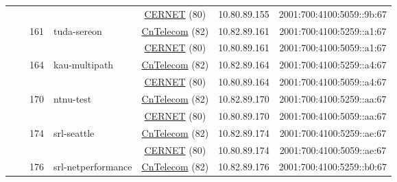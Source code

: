 \begin{small}
\begin{center}
\begin{longtable}{|c|c|c|c|c|c|c|c|}
  &  &  &  & \multicolumn{2}{|c|}{\tiny{\href{http://www.cernet.edu.cn}{CERNET} (80)}} & \tiny{10.80.89.155} & \tiny{2001:700:4100:5059::9b:67} \\* \cline{3-3}\cline{4-4}\cline{5-5}\cline{6-6}\cline{7-7}\cline{8-8}
  &  & \multirow{2}{*}{\tiny{161}} & \multicolumn{1}{|l|}{\multirow{2}{*}{\tiny{tuda-sereon}}} & \multicolumn{2}{|c|}{\tiny{\href{http://www.chinatelecom.com.cn}{CnTelecom} (82)}} & \tiny{10.82.89.161} & \tiny{2001:700:4100:5259::a1:67} \\* \cline{5-5}\cline{6-6}\cline{7-7}\cline{8-8}
  &  &  &  & \multicolumn{2}{|c|}{\tiny{\href{http://www.cernet.edu.cn}{CERNET} (80)}} & \tiny{10.80.89.161} & \tiny{2001:700:4100:5059::a1:67} \\* \cline{3-3}\cline{4-4}\cline{5-5}\cline{6-6}\cline{7-7}\cline{8-8}
  &  & \multirow{2}{*}{\tiny{164}} & \multicolumn{1}{|l|}{\multirow{2}{*}{\tiny{kau-multipath}}} & \multicolumn{2}{|c|}{\tiny{\href{http://www.chinatelecom.com.cn}{CnTelecom} (82)}} & \tiny{10.82.89.164} & \tiny{2001:700:4100:5259::a4:67} \\* \cline{5-5}\cline{6-6}\cline{7-7}\cline{8-8}
  &  &  &  & \multicolumn{2}{|c|}{\tiny{\href{http://www.cernet.edu.cn}{CERNET} (80)}} & \tiny{10.80.89.164} & \tiny{2001:700:4100:5059::a4:67} \\* \cline{3-3}\cline{4-4}\cline{5-5}\cline{6-6}\cline{7-7}\cline{8-8}
  &  & \multirow{2}{*}{\tiny{170}} & \multicolumn{1}{|l|}{\multirow{2}{*}{\tiny{ntnu-test}}} & \multicolumn{2}{|c|}{\tiny{\href{http://www.chinatelecom.com.cn}{CnTelecom} (82)}} & \tiny{10.82.89.170} & \tiny{2001:700:4100:5259::aa:67} \\* \cline{5-5}\cline{6-6}\cline{7-7}\cline{8-8}
  &  &  &  & \multicolumn{2}{|c|}{\tiny{\href{http://www.cernet.edu.cn}{CERNET} (80)}} & \tiny{10.80.89.170} & \tiny{2001:700:4100:5059::aa:67} \\* \cline{3-3}\cline{4-4}\cline{5-5}\cline{6-6}\cline{7-7}\cline{8-8}
  &  & \multirow{2}{*}{\tiny{174}} & \multicolumn{1}{|l|}{\multirow{2}{*}{\tiny{srl-seattle}}} & \multicolumn{2}{|c|}{\tiny{\href{http://www.chinatelecom.com.cn}{CnTelecom} (82)}} & \tiny{10.82.89.174} & \tiny{2001:700:4100:5259::ae:67} \\* \cline{5-5}\cline{6-6}\cline{7-7}\cline{8-8}
  &  &  &  & \multicolumn{2}{|c|}{\tiny{\href{http://www.cernet.edu.cn}{CERNET} (80)}} & \tiny{10.80.89.174} & \tiny{2001:700:4100:5059::ae:67} \\* \cline{3-3}\cline{4-4}\cline{5-5}\cline{6-6}\cline{7-7}\cline{8-8}
  &  & \multirow{2}{*}{\tiny{176}} & \multicolumn{1}{|l|}{\multirow{2}{*}{\tiny{srl-netperformance}}} & \multicolumn{2}{|c|}{\tiny{\href{http://www.chinatelecom.com.cn}{CnTelecom} (82)}} & \tiny{10.82.89.176} & \tiny{2001:700:4100:5259::b0:67} \\* \cline{5-5}\cline{6-6}\cline{7-7}\cline{8-8}

\end{longtable}
\end{center}
\end{small}
